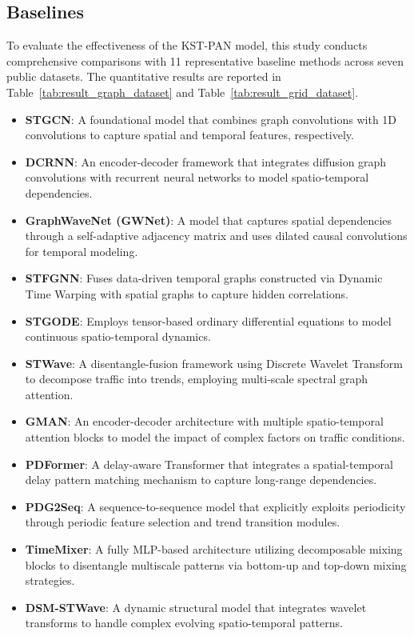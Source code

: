 \documentclass[5p,times,authoryear]{elsarticle}
\begin{document}
\subsection{Baselines}
To evaluate the effectiveness of the KST-PAN model, this study conducts comprehensive comparisons with 11 representative baseline methods across seven public datasets. The quantitative results are reported in Table~\ref{tab:result_graph_dataset} and Table~\ref{tab:result_grid_dataset}.
\begin{itemize}[nosep]

    \item \textbf{STGCN}\citep{yu2018spatio}: A foundational model that combines graph convolutions with 1D convolutions to capture spatial and temporal features, respectively.
    \item \textbf{DCRNN}\citep{li2018dcrnn}: An encoder-decoder framework that integrates diffusion graph convolutions with recurrent neural networks to model spatio-temporal dependencies.
    \item \textbf{GraphWaveNet (GWNet)}\citep{wu2019graph}: A model that captures spatial dependencies through a self-adaptive adjacency matrix and uses dilated causal convolutions for temporal modeling.
    \item \textbf{STFGNN}\citep{li2021spatial}: Fuses data-driven temporal graphs constructed via Dynamic Time Warping with spatial graphs to capture hidden correlations.
    \item \textbf{STGODE}\citep{fang2021spatial}: Employs tensor-based ordinary differential equations to model continuous spatio-temporal dynamics.
    \item \textbf{STWave}\citep{fang2023spatio}: A disentangle-fusion framework using Discrete Wavelet Transform to decompose traffic into trends, employing multi-scale spectral graph attention.
    \item \textbf{GMAN}\citep{zheng2020gman}: An encoder-decoder architecture with multiple spatio-temporal attention blocks to model the impact of complex factors on traffic conditions.
    \item \textbf{PDFormer}\citep{jiang2023pdformer}: A delay-aware Transformer that integrates a spatial-temporal delay pattern matching mechanism to capture long-range dependencies.
    \item \textbf{PDG2Seq}\citep{fan2025pdg2seq}: A sequence-to-sequence model that explicitly exploits periodicity through periodic feature selection and trend transition modules.
   \item \textbf{TimeMixer}\citep{wang2024timemixer}: A fully MLP-based architecture utilizing decomposable mixing blocks to disentangle multiscale patterns via bottom-up and top-down mixing strategies.
    \item \textbf{DSM-STWave}\citep{liang2025dsm}: A dynamic structural model that integrates wavelet transforms to handle complex evolving spatio-temporal patterns.

\end{itemize}
\end{document}
